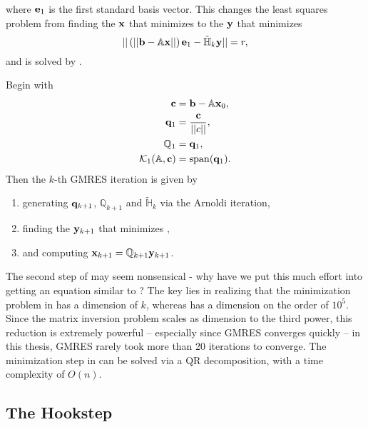 where $\mathbf{e}_1$ is the first standard basis vector. This changes the least squares problem from finding the $\mathbf{x}$ that minimizes  to the $\mathbf{y}$ that minimizes
\begin{equation}\label{eq:GMRESMIN}
|| \left ( ||\mathbf{b} - \mathbb{A}\mathbf{x}|| \right )\mathbf{e}_1 - \mathbb{\tilde{H}}_k \mathbf{y} || = r,
\end{equation}
and is solved by .
  \begin{algorithm}\label{alg:GMRES}
   Begin with
 \begin{align*}
 \mathbf{c} &= \mathbf{b} - \mathbb{A}\mathbf{x}_0,\\
  \mathbf{q}_1 &= \dfrac{\mathbf{c}}{||c||}, \\
  \mathbb{Q}_1 &= \mathbf{q}_1,\\
  \mathcal{K}_1(\mathbb{A},\mathbf{c}) &= \mathrm{span}(\mathbf{q}_1).
  \end{align*}
  Then the $k$-th GMRES iteration is given by  
  \begin{enumerate}
  \item generating $\mathbf{q}_{k+1}$, $\mathbb{Q}_{k+1}$ and $\mathbb{\tilde{H}}_k$ via the Arnoldi iteration,
  \item finding the $\mathbf{y}_{k+1}$ that minimizes ,
  \item and computing $\mathbf{x}_{k+1} = \mathbb{Q}_{k+1}\mathbf{y}_{k+1}$.
  \end{enumerate}
  \end{algorithm}

 The second step of  may seem nonsensical - why have we put this much effort into getting an equation similar to ? The key lies in realizing that the minimization problem in   has a dimension of $k$, whereas  has a dimension on the order of $10^5$. Since the matrix inversion problem scales as dimension to the third power, this reduction is extremely powerful -- especially since GMRES converges quickly -- in this thesis, GMRES rarely took more than 20 iterations to converge. The minimization step in   can be solved via a QR decomposition, with a time complexity of $O(n)$.  
 
 \subsection{The Hookstep}
 
